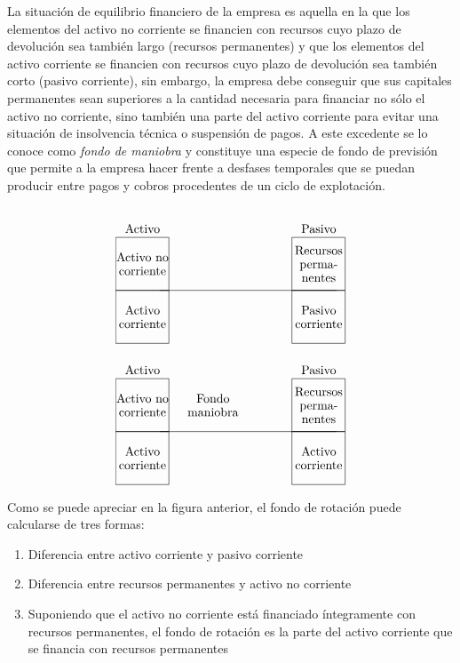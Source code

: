 \documentclass[10pt,a4paper,spanish]{report}
\begin{document}
    	La situación de equilibrio financiero de la empresa es aquella en la que los elementos del activo no corriente se financien con recursos cuyo plazo de devolución sea también largo (recursos permanentes) y que los elementos del activo corriente se financien con recursos cuyo plazo de devolución sea también corto (pasivo corriente), sin embargo, la empresa debe conseguir que sus capitales permanentes sean superiores a la cantidad necesaria para financiar no sólo el activo no corriente, sino también una parte del activo corriente para  evitar una situación de insolvencia técnica o suspensión de pagos. A este excedente se lo conoce como \textit{\textcolor[rgb]{0.4,0.7,0.4}{fondo de maniobra}} y constituye una especie de fondo de previsión que permite a la empresa hacer frente a desfases temporales que se puedan producir entre pagos y cobros procedentes de un ciclo de explotación.
    	\newpage
    	\[\begin{xy}
            ,(0,0)*+=[]=<1.5cm>[]\txt<1.5cm>{Activo}
            ,(0,-10)*+=[]=<1.5cm>[F]\txt<1.5cm>{Activo no corriente}
            ,(0,-25)*+=[]=<1.5cm>[F]\txt<1.5cm>{Activo corriente}
            ,(50,0)*+=[]=<1.5cm>[]\txt<1.5cm>{Pasivo}
            ,(50,-10)*+=[]=<1.5cm>[F]\txt<1.5cm>{Recursos permanentes}
            ,(50,-25)*+=[]=<1.5cm>[F]\txt<1.5cm>{Pasivo corriente}
            ,(0, -40)*+=[]=<1.5cm>[]\txt<1.5cm>{Activo}
            ,(0, -50)*+=[]=<1.5cm>[F]\txt<1.5cm>{Activo no corriente}
            ,(0, -65)*+=[]=<1.5cm>[F]\txt<1.5cm>{Activo corriente}
            ,(50,-40)*+=[]=<1.5cm>[]\txt<1.5cm>{Pasivo}
            ,(50,-50)*+=[]=<1.5cm>[F]\txt<1.5cm>{Recursos permanentes}
            ,(50,-65)*+=[]=<1.5cm>[F]\txt<1.5cm>{Activo corriente}
            ,(20,-50)*+=[]=<1.5cm>[]\txt<1.5cm>{Fondo maniobra}
            \ar@{-} (5,-17.5);(55,-17.5)
            \ar@{-} (5,-57.5);(55,-57.5)
    	\end{xy}\]

    	Como se puede apreciar en la figura anterior, el fondo de rotación puede calcularse de tres formas:
    	\begin{enumerate}[---]
    		\item Diferencia entre activo corriente y pasivo corriente
    		\item Diferencia entre recursos permanentes y activo no corriente
    		\item Suponiendo que el activo no corriente está financiado íntegramente con recursos permanentes, el fondo de rotación es la parte del activo corriente que se financia con recursos permanentes
    	\end{enumerate}
\end{document}
